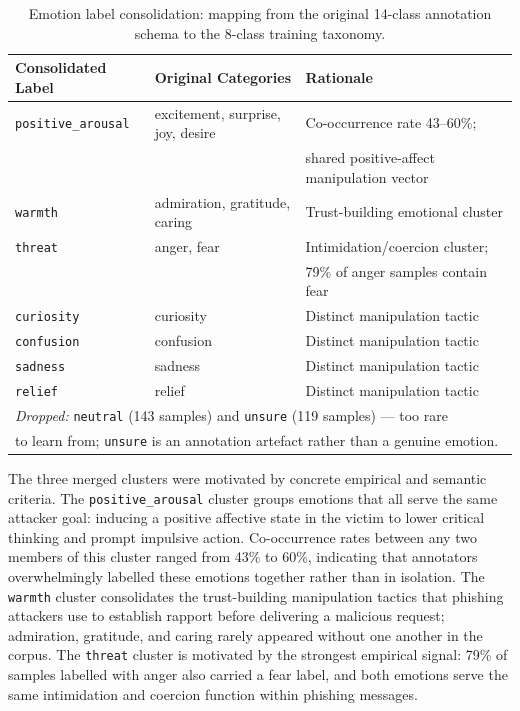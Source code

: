 \begin{table}[htbp]
\centering
\caption{Emotion label consolidation: mapping from the original 14-class annotation schema to the 8-class training taxonomy.}
\label{tab:emotion_merging}
\begin{tabular}{lll}
\hline
\textbf{Consolidated Label} & \textbf{Original Categories} & \textbf{Rationale} \\
\hline
\texttt{positive\_arousal} & excitement, surprise, joy, desire & Co-occurrence rate 43–60\%; \\
                           &                                    & shared positive-affect manipulation vector \\
\texttt{warmth}            & admiration, gratitude, caring      & Trust-building emotional cluster \\
\texttt{threat}            & anger, fear                        & Intimidation/coercion cluster; \\
                           &                                    & 79\% of anger samples contain fear \\
\texttt{curiosity}         & curiosity                          & Distinct manipulation tactic \\
\texttt{confusion}         & confusion                          & Distinct manipulation tactic \\
\texttt{sadness}           & sadness                            & Distinct manipulation tactic \\
\texttt{relief}            & relief                             & Distinct manipulation tactic \\
\hline
\multicolumn{3}{l}{\textit{Dropped:} \texttt{neutral} (143 samples) and \texttt{unsure} (119 samples) — too rare} \\
\multicolumn{3}{l}{to learn from; \texttt{unsure} is an annotation artefact rather than a genuine emotion.} \\
\hline
\end{tabular}
\end{table}

The three merged clusters were motivated by concrete empirical and semantic criteria. The \texttt{positive\_arousal} cluster groups emotions that all serve the same attacker goal: inducing a positive affective state in the victim to lower critical thinking and prompt impulsive action. Co-occurrence rates between any two members of this cluster ranged from 43\% to 60\%, indicating that annotators overwhelmingly labelled these emotions together rather than in isolation. The \texttt{warmth} cluster consolidates the trust-building manipulation tactics that phishing attackers use to establish rapport before delivering a malicious request; admiration, gratitude, and caring rarely appeared without one another in the corpus. The \texttt{threat} cluster is motivated by the strongest empirical signal: 79\% of samples labelled with anger also carried a fear label, and both emotions serve the same intimidation and coercion function within phishing messages.

